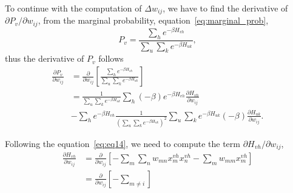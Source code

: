 To continue with the computation of $\Delta w_{ij}$, we have to find the derivative of $\partial P_{v}/\partial w_{ij}$, from the marginal probability, equation~\ref{eq:marginal_prob}, 
\begin{equation}
  P_{v} = \frac{\sum_{h} e^{-\beta H_{v h}}}{\sum_{u} \sum_{k} e^{-\beta H_{u k}}},
  \label{eq:marginal_prob_expansion}
\end{equation}
thus the derivative of $P_{v}$ follows
\begin{equation}
  \begin{split}
    \frac{\partial P_{v}}{\partial w_{ij}} & = \frac{\partial}{\partial w_{ij}} \left[ \frac{\sum_{h} e^{-\beta H_{v h}}}{\sum_{u} \sum_{k} e^{-\beta H_{u k}}} \right] \\
    & = \frac{1}{\sum_{u} \sum_{k} e^{-\beta H_{u k}}} \sum_{h} (-\beta) e^{-\beta H_{v h}} \frac{\partial H_{v h}}{\partial w_{ij}} \\
    & - \sum_{h} e^{-\beta H_{v h}} \frac{1}{{\left( \sum_{u} \sum_{k} e^{-\beta H_{u k}} \right)}^{2}} \sum_{u} \sum_{k} e^{-\beta H_{u k}} (-\beta) \frac{\partial H_{u k}}{\partial w_{ij}}.
  \end{split}
  \label{eq:eq14}
\end{equation}

Following the equation~\ref{eq:eq14}, we need to compute the term $\partial H_{v h}/\partial w_{ij}$,
\begin{equation}
  \begin{split}
      \frac{\partial H_{vh}}{\partial w_{ij}} & = \frac{\partial}{\partial w_{ij}} \left[ -\sum_{m} \sum_{n} w_{mn} x^{vh}_{m} x^{vh}_{n} - \sum_{m} w_{mm} x^{vh}_{m} \right] \\
                                              & = \frac{\partial}{\partial w_{ij}} \left[ -\sum_{m \neq i}  \right]
  \end{split}
\end{equation}



